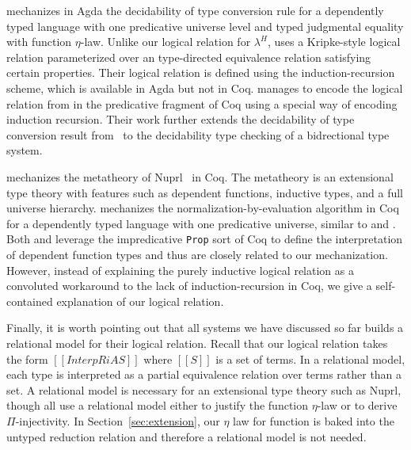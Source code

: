 \documentclass[acmsmall]{acmart}
\newcommand{\lang}{$\lambda^H$\xspace}
\begin{document}
\citet{decagda} mechanizes in Agda the decidability of type
conversion rule for a dependently typed language with one predicative
universe level and typed judgmental equality with function
$\eta$-law. Unlike our logical relation for \lang{}, \citet{decagda}
uses a Kripke-style logical relation parameterized over an
type-directed equivalence relation satisfying certain
properties. Their logical relation is defined using the
induction-recursion scheme, which is available in Agda but not in Coq.
\citet{martin-lof-a-la-coq} manages to encode the logical relation
from \citet{decagda} in the predicative fragment of Coq using a
special way of encoding induction recursion. Their work further
extends the decidability of type conversion result from~\citet{decagda} to the decidability
type checking of a bidrectional type system.

\citet{anand2014towards} mechanizes the metatheory of
Nuprl~\citep{constable1986implementing} in Coq. The metatheory is an
extensional type theory with features such as dependent functions,
inductive types, and a full universe hierarchy. \citet{nbeincoq}
mechanizes the normalization-by-evaluation algorithm in Coq for a
dependently typed language with one predicative universe, similar to
\citet{decagda} and \citet{martin-lof-a-la-coq}. Both
\citet{anand2014towards} and \citet{nbeincoq} leverage the
impredicative \texttt{Prop} sort of Coq to define the interpretation
of dependent function types and thus are closely related to our
mechanization. However, instead of explaining the purely inductive
logical relation as a convoluted workaround to the lack of
induction-recursion in Coq, we give a self-contained explanation of
our logical relation.

Finally, it is worth pointing out that all systems we have discussed
so far builds a relational model for their logical relation. Recall
that our logical relation takes the form $[[InterpR i A S]]$ where
$[[S]]$ is a set of terms. In a relational model, each type is
interpreted as a partial equivalence relation over terms rather than a
set. A relational model is necessary for an extensional type theory
such as Nuprl, though \citet{nbeincoq,decagda,martin-lof-a-la-coq} all
use a relational model either to justify the function $\eta$-law or to
derive $\Pi$-injectivity. In Section~\ref{sec:extension}, our $\eta$
law for function is baked into the untyped reduction
relation and therefore a relational model is not needed.
\end{document}

